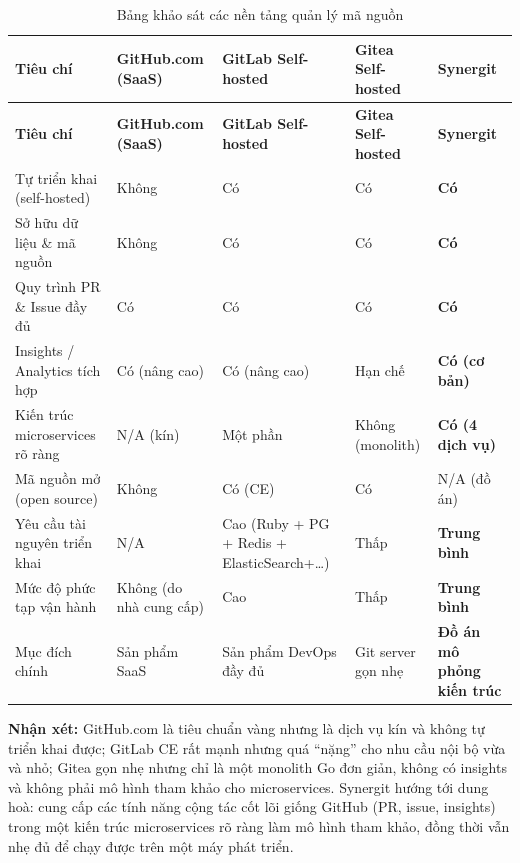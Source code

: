 \renewcommand{\arraystretch}{1.3}
\begin{longtable}{|>{\raggedright\arraybackslash}m{2.9cm}|>{\centering\arraybackslash}m{2.6cm}|>{\centering\arraybackslash}m{2.4cm}|>{\centering\arraybackslash}m{2.4cm}|>{\centering\arraybackslash}m{2.2cm}|}
\caption{Bảng khảo sát các nền tảng quản lý mã nguồn}\label{tab:khaosat}\\
\hline\rowcolor{sgCream}
\textbf{Tiêu chí} & \textbf{GitHub.com (SaaS)} & \textbf{GitLab Self-hosted} & \textbf{Gitea Self-hosted} & \textbf{Synergit}\\
\hline\endfirsthead
\hline\rowcolor{sgCream}\textbf{Tiêu chí} & \textbf{GitHub.com (SaaS)} & \textbf{GitLab Self-hosted} & \textbf{Gitea Self-hosted} & \textbf{Synergit}\\\hline\endhead
Tự triển khai (self-hosted) & Không & Có & Có & \textbf{Có}\\\hline
Sở hữu dữ liệu \& mã nguồn & Không & Có & Có & \textbf{Có}\\\hline
Quy trình PR \& Issue đầy đủ & Có & Có & Có & \textbf{Có}\\\hline
Insights / Analytics tích hợp & Có (nâng cao) & Có (nâng cao) & Hạn chế & \textbf{Có (cơ bản)}\\\hline
Kiến trúc microservices rõ ràng & N/A (kín) & Một phần & Không (monolith) & \textbf{Có (4 dịch vụ)}\\\hline
Mã nguồn mở (open source) & Không & Có (CE) & Có & N/A (đồ án)\\\hline
Yêu cầu tài nguyên triển khai & N/A & Cao (Ruby + PG + Redis + ElasticSearch+\ldots) & Thấp & \textbf{Trung bình}\\\hline
Mức độ phức tạp vận hành & Không (do nhà cung cấp) & Cao & Thấp & \textbf{Trung bình}\\\hline
Mục đích chính & Sản phẩm SaaS & Sản phẩm DevOps đầy đủ & Git server gọn nhẹ & \textbf{Đồ án mô phỏng kiến trúc}\\\hline
\end{longtable}

\noindent\textbf{Nhận xét:} GitHub.com là tiêu chuẩn vàng nhưng là dịch vụ kín và không tự triển khai được; GitLab CE rất mạnh nhưng quá ``nặng'' cho nhu cầu nội bộ vừa và nhỏ; Gitea gọn nhẹ nhưng chỉ là một monolith Go đơn giản, không có insights và không phải mô hình tham khảo cho microservices. Synergit hướng tới dung hoà: cung cấp các tính năng cộng tác cốt lõi giống GitHub (PR, issue, insights) trong một kiến trúc microservices rõ ràng làm mô hình tham khảo, đồng thời vẫn nhẹ đủ để chạy được trên một máy phát triển.

